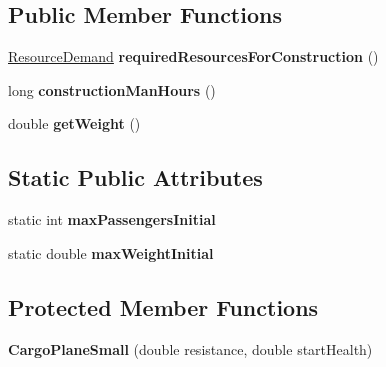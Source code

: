\subsection*{Public Member Functions}
\begin{DoxyCompactItemize}
\item 
\hyperlink{classuniverse_1_1_resource_demand}{Resource\+Demand} {\bfseries required\+Resources\+For\+Construction} ()\hypertarget{classtools_1_1vehicles_1_1air_1_1_cargo_plane_small_a9e1969a825c8f14900f239a52486b508}{}\label{classtools_1_1vehicles_1_1air_1_1_cargo_plane_small_a9e1969a825c8f14900f239a52486b508}

\item 
long {\bfseries construction\+Man\+Hours} ()\hypertarget{classtools_1_1vehicles_1_1air_1_1_cargo_plane_small_af6db1d18c6cbd0f8380a2718acf9b49a}{}\label{classtools_1_1vehicles_1_1air_1_1_cargo_plane_small_af6db1d18c6cbd0f8380a2718acf9b49a}

\item 
double {\bfseries get\+Weight} ()\hypertarget{classtools_1_1vehicles_1_1air_1_1_cargo_plane_small_a3ed6d474ce831a2e11017b72117c759e}{}\label{classtools_1_1vehicles_1_1air_1_1_cargo_plane_small_a3ed6d474ce831a2e11017b72117c759e}

\end{DoxyCompactItemize}
\subsection*{Static Public Attributes}
\begin{DoxyCompactItemize}
\item 
static int {\bfseries max\+Passengers\+Initial}\hypertarget{classtools_1_1vehicles_1_1air_1_1_cargo_plane_small_a1862c6749d175bfe62431b8f0f5fede7}{}\label{classtools_1_1vehicles_1_1air_1_1_cargo_plane_small_a1862c6749d175bfe62431b8f0f5fede7}

\item 
static double {\bfseries max\+Weight\+Initial}\hypertarget{classtools_1_1vehicles_1_1air_1_1_cargo_plane_small_a0e0e62510a3df07c9aa648e04d946571}{}\label{classtools_1_1vehicles_1_1air_1_1_cargo_plane_small_a0e0e62510a3df07c9aa648e04d946571}

\end{DoxyCompactItemize}
\subsection*{Protected Member Functions}
\begin{DoxyCompactItemize}
\item 
{\bfseries Cargo\+Plane\+Small} (double resistance, double start\+Health)\hypertarget{classtools_1_1vehicles_1_1air_1_1_cargo_plane_small_a283230c996252bc6a396ace14fdb5036}{}\label{classtools_1_1vehicles_1_1air_1_1_cargo_plane_small_a283230c996252bc6a396ace14fdb5036}

\end{DoxyCompactItemize}
